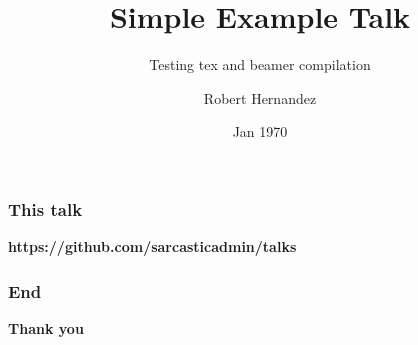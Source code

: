 \documentclass{beamer}
\title{Simple Example Talk}
\subtitle{Testing tex and beamer compilation}
\author{
  Robert Hernandez \\
}
\date{Jan 1970}
\begin{document}
\frame{\titlepage}

\begin{frame}
\frametitle{This talk}
  \begin{center}
  {\large \textbf{https://github.com/sarcasticadmin/talks}}
  \end{center}
\end{frame}

\begin{frame}
\frametitle{End}
  \begin{center}
  {\large \textbf{Thank you}}
  \end{center}
\end{frame}
\end{document}
